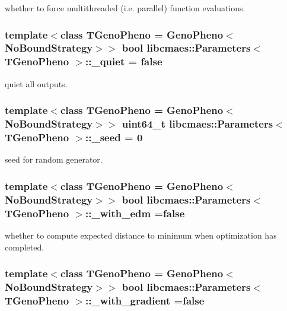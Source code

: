 whether to force multithreaded (i.\-e. parallel) function evaluations. \hypertarget{classlibcmaes_1_1Parameters_a6f6dad55c02a23891e3280cad288295a}{
\subsubsection[{\-\_\-quiet}]{\setlength{\rightskip}{0pt plus 5cm}template$<$class T\-Geno\-Pheno = Geno\-Pheno$<$\-No\-Bound\-Strategy$>$$>$ bool {\bf libcmaes\-::\-Parameters}$<$ T\-Geno\-Pheno $>$\-::\-\_\-quiet = false}}\label{classlibcmaes_1_1Parameters_a6f6dad55c02a23891e3280cad288295a}
quiet all outputs. \hypertarget{classlibcmaes_1_1Parameters_ac6d616c3d5295fec8a0b230592fb767a}{
\subsubsection[{\-\_\-seed}]{\setlength{\rightskip}{0pt plus 5cm}template$<$class T\-Geno\-Pheno = Geno\-Pheno$<$\-No\-Bound\-Strategy$>$$>$ uint64\-\_\-t {\bf libcmaes\-::\-Parameters}$<$ T\-Geno\-Pheno $>$\-::\-\_\-seed = 0}}\label{classlibcmaes_1_1Parameters_ac6d616c3d5295fec8a0b230592fb767a}
seed for random generator. \hypertarget{classlibcmaes_1_1Parameters_adbaa11317ae66061e097c372522b8758}{
\subsubsection[{\-\_\-with\-\_\-edm}]{\setlength{\rightskip}{0pt plus 5cm}template$<$class T\-Geno\-Pheno = Geno\-Pheno$<$\-No\-Bound\-Strategy$>$$>$ bool {\bf libcmaes\-::\-Parameters}$<$ T\-Geno\-Pheno $>$\-::\-\_\-with\-\_\-edm =false}}\label{classlibcmaes_1_1Parameters_adbaa11317ae66061e097c372522b8758}
whether to compute expected distance to minimum when optimization has completed. \hypertarget{classlibcmaes_1_1Parameters_aff76cebbfef51c20398aab8f49a3676a}{
\subsubsection[{\-\_\-with\-\_\-gradient}]{\setlength{\rightskip}{0pt plus 5cm}template$<$class T\-Geno\-Pheno = Geno\-Pheno$<$\-No\-Bound\-Strategy$>$$>$ bool {\bf libcmaes\-::\-Parameters}$<$ T\-Geno\-Pheno $>$\-::\-\_\-with\-\_\-gradient =false}}\label{classlibcmaes_1_1Parameters_aff76cebbfef51c20398aab8f49a3676a}
